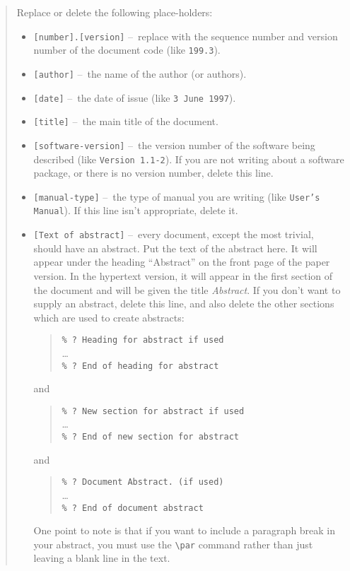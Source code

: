 \documentclass[twoside,11pt]{article}
\renewcommand{\_}{\texttt{\symbol{95}}}
\newcommand{\dash}{--}
\newcommand{\dash}{-}
\begin{document}
\begin{quote}
Replace or delete the following place-holders:
\begin{itemize}
\item \texttt{[number].[version]} \dash\ replace with the sequence number and
 version number of the document code (like \texttt{199.3}).
\item \texttt{[author]} \dash\ the name of the author (or authors).
\item \texttt{[date]} \dash\ the date of issue (like \texttt{3 June 1997}).
\item \texttt{[title]} \dash\ the main title of the document.
\item \texttt{[software-version]} \dash\ the version number of the software
being described (like \texttt{Version 1.1-2}).
 If you are not writing about a software package, or there is no version
 number, delete this line.
\item \texttt{[manual-type]} \dash\ the type of manual you are writing
 (like \texttt{User's Manual}).
 If this line isn't appropriate, delete it.
\item \texttt{[Text of abstract]} \dash\ every document, except the most
 trivial, should have an abstract.
 Put the text of the abstract here.
 It will appear under the heading ``Abstract'' on the front page of the paper
 version.
 In the hypertext version, it will appear in the first section of the document
 and will be given the title \emph{Abstract}.
 If you don't want to supply an abstract, delete this line, and also delete
 the other sections which are used to create abstracts:
\begin{quote}
\verb#% ? Heading for abstract if used#\\
\ldots\\
\verb#% ? End of heading for abstract#
\end{quote}
 and
\begin{quote}
\verb#% ? New section for abstract if used#\\
\ldots\\
\verb#% ? End of new section for abstract#
\end{quote}
 and
\begin{quote}
\verb#% ? Document Abstract. (if used)#\\
\ldots\\
\verb#% ? End of document abstract#
\end{quote}
One point to note is that if you want to include a paragraph break in your
abstract, you must use the \verb+\par+ command rather than just leaving a
blank line in the text.
\end{itemize}
\end{quote}
\end{document}
